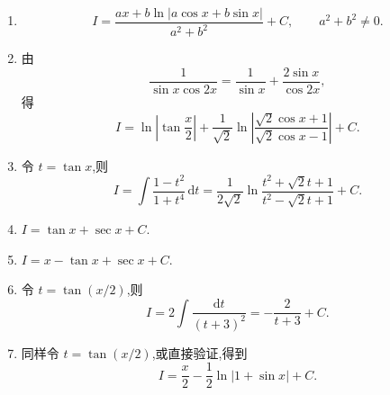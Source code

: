 \begin{solution}
    \leavevmode
    \begin{enumerate}
        \item
              \[
                  I=\dfrac{ax+b\ln|a\cos x+b\sin x|}{a^2+b^2}+C,
                  \qquad a^2+b^2\neq0.
              \]
        \item 由
              \[
                  \dfrac{1}{\sin x\cos2x}=\dfrac{1}{\sin x}+\dfrac{2\sin x}{\cos2x},
              \]
              得
              \[
                  I=\ln\left|\tan\dfrac{x}{2}\right|
                  +\dfrac{1}{\sqrt2}\ln\left|\dfrac{\sqrt2\cos x+1}{\sqrt2\cos x-1}\right|+C.
              \]
        \item 令 $t=\tan x$,则
              \[
                  I=\int\dfrac{1-t^2}{1+t^4}\,\mathrm{d}t
                  =\dfrac{1}{2\sqrt2}\ln\dfrac{t^2+\sqrt2t+1}{t^2-\sqrt2t+1}+C.
              \]
        \item $\displaystyle I=\tan x+\sec x+C$.
        \item $\displaystyle I=x-\tan x+\sec x+C$.
        \item 令 $t=\tan(x/2)$,则
              \[
                  I=2\int\dfrac{\mathrm{d}t}{(t+3)^2}
                  =-\dfrac{2}{t+3}+C.
              \]
        \item 同样令 $t=\tan(x/2)$,或直接验证,得到
              \[
                  I=\dfrac{x}{2}-\dfrac{1}{2}\ln|1+\sin x|+C.
              \]
    \end{enumerate}
\end{solution}
